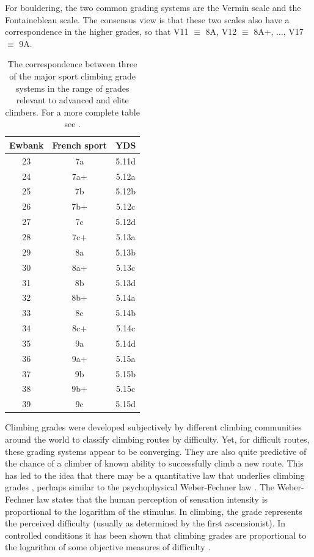 \documentclass[12pt]{article}
\begin{document}
For bouldering, the two common grading systems are the Vermin scale and the Fontainebleau scale. The consensus view is that these two scales also have a correspondence in the higher grades, so that V11 $\equiv$ 8A, V12 $\equiv$ 8A+, $\dots$, V17 $\equiv$ 9A.


\begin{table}
\centering
\begin{tabular}{| c | c | c |}
  \hline
  {\bf Ewbank} & {\bf French sport} & {\bf YDS} \\
  \hline
  23 & 7a & 5.11d \\
  24 & 7a+ & 5.12a \\
  25 & 7b & 5.12b \\
  26 & 7b+ & 5.12c \\
  27 & 7c & 5.12d \\
  28 & 7c+ & 5.13a \\
  29 & 8a & 5.13b \\
  30 & 8a+ & 5.13c \\
  31 & 8b & 5.13d \\
  32 & 8b+ & 5.14a \\
  33 & 8c & 5.14b \\
  34 & 8c+ & 5.14c \\
  35 & 9a & 5.14d \\
  36 & 9a+ & 5.15a \\
  37 & 9b & 5.15b \\
  38 & 9b+ & 5.15c \\
  39 & 9c & 5.15d \\
  \hline
\end{tabular}
\caption{The correspondence between three of the major sport climbing grade systems in the range of grades relevant to advanced and elite climbers. For a more complete table see \citet{draper2015comparative}. }
\label{table1}
\end{table}

Climbing grades were developed subjectively by different climbing communities around the world to classify climbing routes by difficulty. Yet, for difficult routes, these grading systems appear to be converging. They are also quite predictive of the chance of a climber of known ability to successfully climb a new route.  This has led to the idea that there may be a quantitative law that underlies climbing grades \citep{delignieres1993psychophysical}, perhaps similar to the psychophysical Weber-Fechner law \citep{1834pulsu,fechner1860}. The Weber-Fechner law states that the human perception of sensation intensity is proportional to the logarithm of the stimulus.  In climbing, the grade represents the perceived difficulty (usually as determined by the first ascensionist). In controlled conditions it has been shown that climbing grades are proportional to the logarithm of some objective measures of difficulty \citep{delignieres1993psychophysical}.
\end{document}
